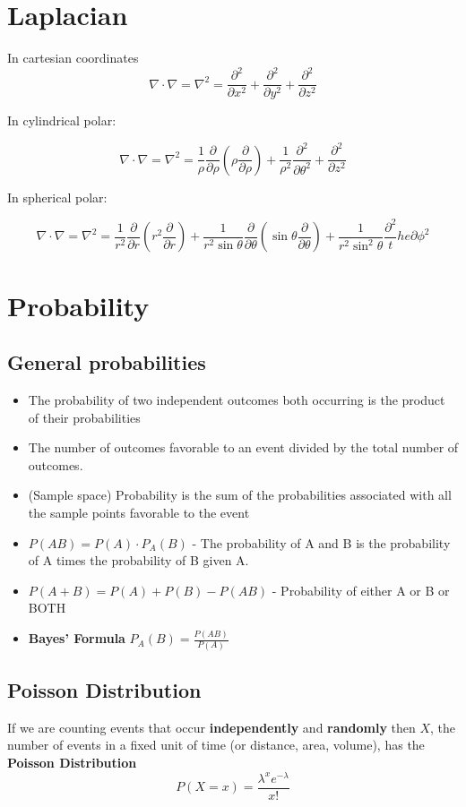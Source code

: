 \documentclass{article}
\begin{document}
\section{Laplacian}
In cartesian coordinates
$$
\nabla \cdot \nabla = \nabla^2 = \frac{\partial^2}{\partial x^2} + \frac{\partial^2}{\partial y^2} + \frac{\partial^2}{\partial z^2}
$$

In cylindrical polar:

$$
\nabla \cdot \nabla = \nabla^2 = \frac{1}{\rho}\frac{\partial}{\partial \rho}\left( \rho\frac{\partial}{\partial\rho}\right) + \frac{1}{\rho^2}\frac{\partial^2}{\partial \theta^2} + \frac{\partial^2}{\partial z^2}
$$

In spherical polar:

$$
\nabla \cdot \nabla = \nabla^2 =
\frac{1}{r^2}\frac{\partial}{\partial r}\left( r^2 \frac{\partial}{\partial r} \right) + \frac{1}{r^2 \sin \theta}\frac{\partial}{\partial \theta} \left( \sin \theta \frac{\partial}{\partial \theta} \right) + \frac{1}{r^2 \sin^2 \theta} \frac{\partial^2}the{\partial \phi^2}
$$

\section{Probability}
\subsection{General probabilities}
\begin{itemize}
    \item The probability of two independent outcomes both occurring is the product of their
    probabilities
	\item The number of outcomes favorable to an event divided by the total number of outcomes.
	\item (Sample space) Probability is the sum of the probabilities associated with all the sample points favorable to the event
	\item $P(AB) = P(A) \cdot P_A(B)$ - The probability of A and B is the probability of A times the probability of B given A.
	\item $P(A+B) = P(A) + P(B) - P(AB)$ - Probability of either A or B or BOTH
	\item \textbf{Bayes' Formula} $P_A(B) = \frac{P(AB)}{P(A)}$
\end{itemize}

\subsection{Poisson Distribution}
If we are counting events that occur \textbf{independently} and \textbf{randomly} then $X$, the number of events in a fixed unit of time (or distance, area, volume), has the \textbf{Poisson Distribution}
$$
P(X=x) = \frac{\lambda^x e^{-\lambda}}{x!}
$$
\end{document}
